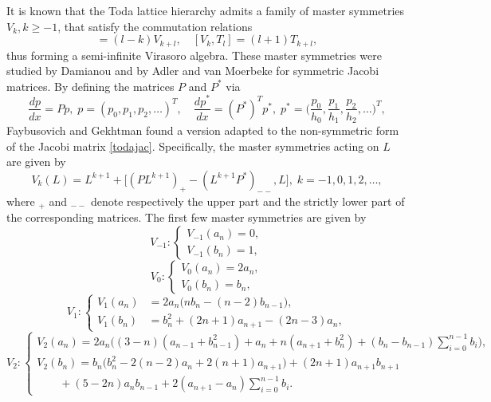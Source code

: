 \documentclass[10pt, reqno]{amsart}
\numberwithin{equation}{section}
\numberwithin{equation}{section}
\begin{document}
It is known that the Toda lattice hierarchy admits a family of master symmetries $V_k, k\geq -1$, that satisfy the commutation relations
\begin{equation*}
[V_k,V_l]=(l-k)V_{k+l},\quad [V_k,T_l]=(l+1)T_{k+l},
\end{equation*}
thus forming a semi-infinite Virasoro algebra. These master symmetries were studied by Damianou \cite{Da} and by Adler and van Moerbeke \cite{AVM} for symmetric Jacobi matrices. By defining the matrices $P$ and $P^*$ via
\begin{equation*}
\frac{dp}{dx}=Pp,\;p=(p_0,p_1, p_2, \ldots)^T, \quad\frac{dp^*}{dx}=(P^*)^Tp^*,\;p^*=\Big(\frac{p_0}{h_0}, \frac{p_1}{h_1},\frac{p_2}{h_2},\ldots\Big)^T, 
\end{equation*}
Faybusovich and Gekhtman \cite{FG} found a version adapted to the non-symmetric form of the Jacobi matrix \eqref{todajac}. Specifically, the master symmetries acting on $L$ are given by 
\begin{equation*}
V_k(L)=L^{k+1}+\big[(PL^{k+1})_{+}-(L^{k+1}P^*)_{--},L],\; k=-1,0,1,2,\ldots, 
\end{equation*}
where $_{+}$ and $_{--}$ denote respectively the upper part and the strictly lower part of the corresponding matrices. The first few master symmetries are given by  
\begin{equation}
V_{-1}: \begin{cases} V_{-1}(a_n)=0,\\
V_{-1}(b_n)=1,\end{cases}\label{Vm1}
\end{equation}
\begin{equation}
V_0:\begin{cases}V_0(a_n) =2a_n,\\
V_0(b_n)=b_n, \end{cases}\label{V0}
\end{equation}
\begin{equation}
V_1: \begin{cases} V_1(a_n)&=2a_n\big(nb_n-(n-2)b_{n-1}\big),\\
V_1(b_n)&=b_n^2+(2n+1)a_{n+1}-(2n-3)a_n,\end{cases}\label{V1}
\end{equation}
\begin{equation}
V_2:\begin{cases}
V_2(a_n)=2a_n\Big((3-n)(a_{n-1}+b_{n-1}^2)+a_n+n(a_{n+1}+b_n^2)+(b_n-b_{n-1})\sum_{i=0}^{n-1}b_i\Big),\\
V_2(b_n)=b_n\Big(b_n^2-2(n-2)a_n+2(n+1)a_{n+1}\Big)+(2n+1)a_{n+1}b_{n+1}
\\\qquad+(5-2n)a_nb_{n-1}+2(a_{n+1}-a_n)\sum_{i=0}^{n-1}b_i.\end{cases}\label{V2}
\end{equation}
\end{document}
